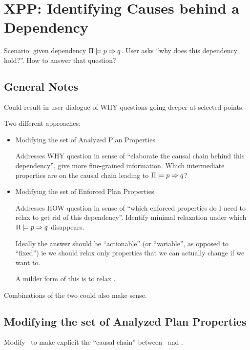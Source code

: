 \section{XPP: Identifying Causes behind a Dependency}
\label{xpp-identify-causes}

Scenario: given dependency $\Pi \models p \Rightarrow q$. User
asks ``why does this dependency hold?''. How to answer that question?



\subsection{General Notes}

Could result in user dialogue of WHY questions going deeper at
selected points.

Two different approaches:
\begin{itemize}
\item Modifying the set of Analyzed Plan Properties

  Addresses WHY question in sense of ``elaborate the causal chain
  behind this dependency'', give more fine-grained information. Which
  intermediate properties are on the causal chain leading to
  $\Pi \models p \Rightarrow q$?

\item Modifying the set of Enforced Plan Properties

  Addresses HOW question in sense of ``which enforced properties do I
  need to relax to get rid of this dependency''. Identify minimal
  relaxation under which $\Pi \models p \Rightarrow q$ disappears.

  Ideally the answer should be ``actionable'' (or ``variable'', as
  opposed to ``fixed'') ie we should relax only properties that we can
  actually change if we want to.

  A milder form of this is to relax \prop.

\end{itemize}

Combinations of the two could also make sense.




\subsection{Modifying the set of Analyzed Plan Properties}
\label{xpp:identify-causes:analyzed}


Modify \props\ to make explicit the ``causal chain'' between
\prop\ and \propq. 

